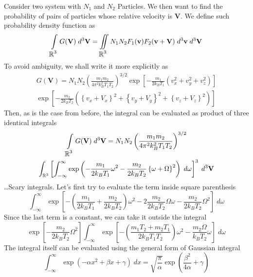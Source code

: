 \documentclass[../../../Main.tex]{subfiles}
\begin{document}
Consider two system with $N_1$ and $N_2$ Particles. We then want to find the probability of pairs of particles whose relative velocity is $\mathbf{V}$. We define such probability density function as 
\begin{equation*}
    \int\displaylimits_{\displaystyle\mathbb{R}^3} G(\mathbf{V}) \; d^3\mathbf{V} = \iint\displaylimits_{ \displaystyle \mathbb{R}^3} N_1 N_2 F_1(\mathbf{v}) F_2(\mathbf{v+V}) \; d^3\mathbf{v}\; d^3\mathbf{V}
\end{equation*}
To avoid ambiguity, we shall write it more explicitly as 
\begin{multline*}
    G(\mathbf{V}) = N_1 N_2 \left(\frac{m_1 m_2}{4\pi^2 k_B^2 T_1 T_2}\right)^{3/2} 
    \exp\left[-\frac{m_1}{2k_B T_1 }\left( v_x^2+v_y^2+v_z^2 \right)\right] \\
    \exp\left[-\frac{m_2}{2k_B T_2 }\left( \left\{v_x+V_x\right\}^2+ \left\{v_y+V_y\right\}^2 + \left\{v_z+V_z\right\}^2\right)\right] 
\end{multline*}
Then, as is the case from before, the integral can be evaluated as product of three identical integrals
\begin{multline*}
    \int\displaylimits_{\displaystyle\mathbb{R}^3} G(\mathbf{V}) \; d^3\mathbf{V} =N_1 N_2 \left(\frac{m_1 m_2}{4\pi^2 k_B^2 T_1 T_2}\right)^{3/2} \\
    \int_{\mathbb{R}^3}\left[  \int_{-\infty}^{\infty}\exp\left( -\frac{m_1}{2k_BT_1} \omega^2-\frac{m_2}{2k_BT_2}\left\{\omega + \Omega\right\}^2 \right)\;d\omega \right]^3\;d^3\mathbf{V}
\end{multline*}
\dots Scary integrals. Let's first try to evaluate the term inside square parenthesis
\begin{equation*}
    \int_{-\infty}^{\infty}\exp\left[-\left(\frac{m_1}{2k_BT_1} +\frac{m_2}{2k_BT_2} \right) \omega^2 -2\frac{m_2}{2k_BT_2}\Omega\omega -\frac{m_2}{2k_BT_2}\Omega^2\right] \;d\omega 
\end{equation*}
Since the last term is a constant, we can take it outside the integral
\begin{equation*}
    \exp\left[-\frac{m_2}{2k_BT_2}\Omega^2\right]\int_{-\infty}^{\infty}\exp\left[-\left(\frac{m_1T_2+ m_2T_1}{2k_BT_1T_2} \right) \omega^2 -\frac{m_2\Omega}{k_BT_2}\omega \right] \;d\omega 
\end{equation*}
The integral itself can be evaluated using the general form of Gaussian integral
\begin{equation*}
    \int_{-\infty}^{\infty}\exp \left( -\alpha x^2+\beta x+\gamma\right)\;dx= \sqrt{\frac{\pi}{\alpha}} \exp \left(\frac{\beta^2}{4\alpha}+\gamma\right)
\end{equation*}
\end{document}
